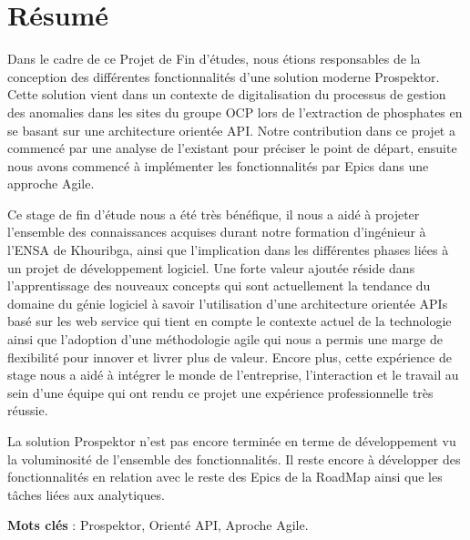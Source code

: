 \chapter*{R\'esum\'e}

Dans le cadre de ce Projet de Fin d'\'etudes, nous \'etions responsables de la conception des diff\'erentes fonctionnalit\'es d'une solution moderne Prospektor. Cette solution vient dans un contexte de digitalisation du processus de gestion des anomalies dans les sites du groupe \gls{OCP} lors de l'extraction de phosphates en se basant sur une architecture orient\'ee \gls{API}. Notre contribution dans ce projet a commenc\'e par une analyse de l'existant pour pr\'eciser le point de d\'epart, ensuite nous avons commenc\'e \`a impl\'ementer les fonctionnalit\'es par Epics dans une approche Agile.

Ce stage de fin d'\'etude nous a \'et\'e tr\`es b\'en\'efique, il nous a aid\'e \`a projeter l'ensemble des connaissances acquises durant notre formation d'ing\'enieur \`a l'ENSA de Khouribga, ainsi que l'implication dans les diff\'erentes phases li\'ees \`a un projet de d\'eveloppement logiciel. Une forte valeur ajout\'ee r\'eside dans l'apprentissage des nouveaux concepts qui sont actuellement la tendance du domaine du g\'enie logiciel \`a savoir l'utilisation d'une architecture orient\'ee APIs bas\'e sur les web service qui tient en compte le contexte actuel de la technologie ainsi que l'adoption d'une m\'ethodologie agile qui nous a permis une marge de flexibilit\'e pour innover et livrer plus de valeur. Encore plus, cette exp\'erience de stage nous a aid\'e \`a int\'egrer le monde de l'entreprise, l'interaction et le travail au sein d'une \'equipe qui ont rendu ce projet une exp\'erience professionnelle tr\`es r\'eussie.

La solution Prospektor n'est pas encore termin\'ee en terme de d\'eveloppement vu la voluminosit\'e de l'ensemble des fonctionnalit\'es. Il reste encore à d\'evelopper des fonctionnalit\'es en relation avec le reste des Epics de la RoadMap ainsi que les t\^aches li\'ees aux analytiques.

\vspace{1.5\baselineskip}

\textbf{Mots cl\'es} : Prospektor, Orient\'e API, Aproche Agile.
